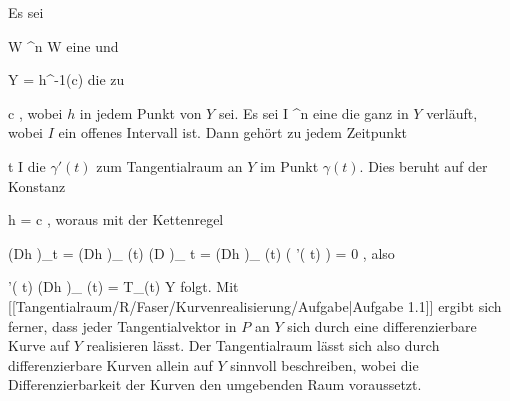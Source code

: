 {}
{

Es sei

\mavergleichskette
{\vergleichskette
{ W
}
{ \subseteq }{ \R^n
}
{  }{
}
{    }{
}
{   }{
}
}
{}{}{}
 { W } { \R
} {}
eine
und

\mavergleichskette
{\vergleichskette
{ Y
}
{ = }{ h^{-1}(c)
}
{  }{
}
{    }{
}
{   }{
}
}
{}{}{}
die
zu

\mavergleichskette
{\vergleichskette
{ c
}
{ \in }{ \R
}
{  }{
}
{    }{
}
{   }{
}
}
{}{}{,}
wobei $h$ in jedem Punkt von $Y$
sei. Es sei
\maabbdisp {\gamma} { I } { \R^n
} {}
eine
die ganz in $Y$ verläuft, wobei $I$ ein offenes Intervall ist. Dann gehört zu jedem Zeitpunkt

\mavergleichskette
{\vergleichskette
{ t
}
{ \in }{ I
}
{  }{
}
{    }{
}
{   }{
}
}
{}{}{}
die
$\gamma'(t)$ zum Tangentialraum an $Y$ im Punkt $\gamma(t)$. Dies beruht auf der Konstanz

\mavergleichskette
{\vergleichskette
{ h \circ \gamma
}
{ = }{ c
}
{  }{
}
{    }{
}
{   }{
}
}
{}{}{,}
woraus mit der Kettenregel

\mavergleichskettedisp
{\vergleichskette
{ \left(Dh \circ \gamma\right)_{t}
}
{ =} { \left(Dh  \right)_{ \gamma(t) }  \circ \left(D \gamma  \right)_{ t }
}
{ =} { \left(Dh  \right)_{ \gamma(t) } ( \gamma'( t) )
}
{ =} { 0
}
{ } {
}
}
{}{}{,}
also

\mavergleichskette
{\vergleichskette
{ \gamma'( t)
}
{ \in }{   \left(Dh \right)_{ \gamma(t) }
}
{ = }{ T_{\gamma(t) }Y
}
{    }{
}
{   }{
}
}
{}{}{}
folgt. Mit
[[Tangentialraum/R/Faser/Kurvenrealisierung/Aufgabe|Aufgabe 1.1]]
ergibt sich ferner, dass jeder Tangentialvektor in $P$ an $Y$ sich durch eine differenzierbare Kurve auf $Y$ realisieren lässt. Der Tangentialraum lässt sich also durch differenzierbare Kurven allein auf $Y$ sinnvoll beschreiben, wobei die Differenzierbarkeit der Kurven den umgebenden Raum  voraussetzt.

}

